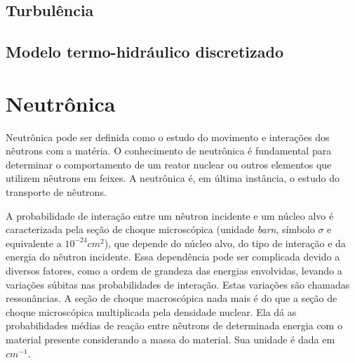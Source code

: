 
\subsection{Turbulência}
\label{subsec:}

\subsection{Modelo termo-hidráulico discretizado}
\label{subsec:modeloth}



\section{Neutrônica}
\label{sec:neutronica}

Neutrônica pode ser definida como o estudo do movimento e interações dos nêutrons
com a matéria. O conhecimento de neutrônica é fundamental para determinar o
comportamento de um reator nuclear ou outros elementos que utilizem nêutrons
em feixes. A neutrônica é, em última instância, o estudo do transporte de nêutrons.

A probabilidade de interação entre um nêutron incidente e um núcleo alvo é caracterizada
pela seção de choque microscópica (unidade \textit{barn}, símbolo $\sigma$ e
equivalente a $10^{-24} cm^2$), que depende do núcleo alvo, do tipo de interação e da
energia do nêutron incidente. Essa dependência pode ser complicada devido a diversos fatores,
como a ordem de grandeza das energias envolvidas, levando a variações súbitas nas probabilidades
de interação. Estas variações são chamadas ressonâncias. A seção de choque macroscópica nada mais
é do que a seção de choque microscópica multiplicada pela densidade nuclear. Ela dá as probabilidades
médias de reação entre nêutrons de determinada energia com o material presente considerando a massa
do material. Sua unidade é dada em $cm^{-1}$.

